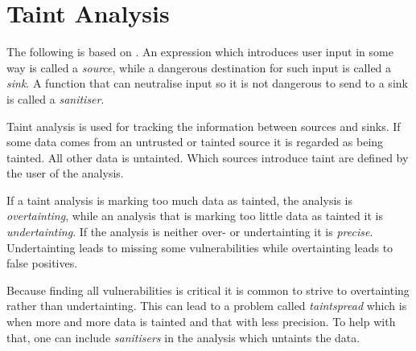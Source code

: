 \section{Taint Analysis}\label{theory:taint}
The following is based on \citet[Part 3]{schwartz2010all}.
An expression which introduces user input in some way is called a \emph{source}, while a dangerous destination for such input is called a \emph{sink}.
A function that can neutralise input so it is not dangerous to send to a sink is called a \emph{sanitiser}.

Taint analysis is used for tracking the information between sources and sinks.
If some data comes from an untrusted or tainted source it is regarded as being tainted.
All other data is untainted.
Which sources introduce taint are defined by the user of the analysis.

If a taint analysis is marking too much data as tainted, the analysis is \textit{overtainting}, while an analysis that is marking too little data as tainted it is \textit{undertainting}.
If the analysis is neither over- or undertainting it is \textit{precise}. 
Undertainting leads to missing some vulnerabilities while overtainting leads to false positives.

Because finding all vulnerabilities is critical it is common to strive to overtainting rather than undertainting.
This can lead to a problem called \textit{taintspread} which is when more and more data is tainted and that with less precision.
To help with that, one can include \textit{sanitisers} in the analysis which untaints the data.
